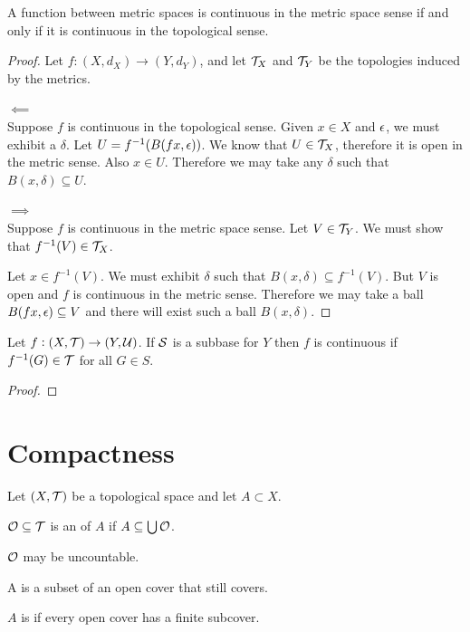 \begin{lemma}
  A function between metric spaces is continuous in the metric space sense if and only if it is
  continuous in the topological sense.
\end{lemma}

\begin{proof}
  Let $f: (X, d_X) \to (Y, d_Y)$, and let $\mathcal T_X$ and $\mathcal T_Y$ be the topologies induced by the
  metrics.

  $\impliedby$\\
  Suppose $f$ is continuous in the topological sense. Given $x \in X$ and $\epsilon$, we must exhibit
  a $\delta$. Let $U = f^{-1}(B(f x, \epsilon))$. We know that $U \in \mathcal T_X$, therefore it is open in
  the metric sense. Also $x \in U$. Therefore we may take any $\delta$ such
  that $B(x, \delta) \subseteq U$.

  $\implies$\\
  Suppose $f$ is continuous in the metric space sense. Let $V \in \mathcal T_Y$. We must show
  that $f^{-1}(V) \in \mathcal T_X$.

  Let $x \in f^{-1}(V)$. We must exhibit $\delta$ such that $B(x, \delta) \subseteq f^{-1}(V)$.
  But $V$ is open and $f$ is continuous in the metric sense. Therefore we may take a
  ball $B(f x, \epsilon) \subseteq V$ and there will exist such a ball $B(x, \delta)$.
\end{proof}





\begin{theorem}
  Let $f: (X, \mathcal T) \to (Y, \mathcal U)$. If $\mathcal S$ is a subbase for $Y$ then $f$ is continuous
  if $f^{-1}(G) \in \mathcal T$ for all $G \in S$.
\end{theorem}

\begin{proof}
\end{proof}




\section{Compactness}

\begin{definition}
  Let $(X, \mathcal T)$ be a topological space and let $A \subset X$.

  $\mathcal O \subseteq \mathcal T$ is an  of $A$ if $A \subseteq \bigcup \mathcal O$.

  $\mathcal O$ may be uncountable.

  A  is a subset of an open cover that still covers.

  $A$ is  if every open cover has a finite subcover.
\end{definition}

